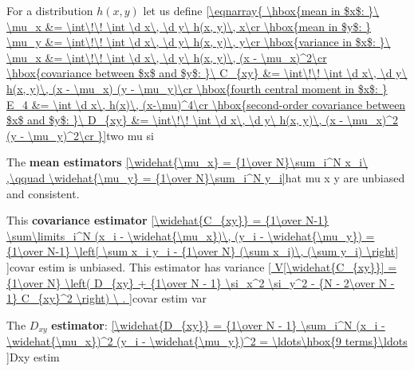 For a distribution $h(x, y)$ let us define
\eqref{\eqnarray{
\hbox{mean in $x$: }\ \mu_x &= \int\!\! \int \d x\, \d y\ h(x, y)\, x\cr
\hbox{mean in $y$: } \mu_y &= \int\!\! \int \d x\, \d y\ h(x, y)\, y\cr
\hbox{variance in $x$: }\ \mu_x &= \int\!\! \int \d x\, \d y\ h(x, y)\, (x - \mu_x)^2\cr
\hbox{covariance between $x$ and $y$: }\ C_{xy} &= \int\!\! \int \d x\, \d y\ h(x, y)\, (x - \mu_x) (y - \mu_y)\cr
\hbox{fourth central moment in $x$: } E_4 &= \int \d x\, h(x)\, (x-\mu)^4\cr
\hbox{second-order covariance between $x$ and $y$: }\ D_{xy} &= \int\!\! \int \d x\, \d y\ h(x, y)\, (x - \mu_x)^2 (y - \mu_y)^2\cr
}}{two mu si}

The {\bf mean estimators}
\eqref{\widehat{\mu_x} = {1\over N}\sum_i^N x_i\ ,\qquad \widehat{\mu_y} = {1\over N}\sum_i^N y_i}{hat mu x y}
are unbiased and consistent.

This {\bf covariance estimator}
\eqref{\widehat{C_{xy}}
	= {1\over N-1} \sum\limits_i^N (x_i - \widehat{\mu_x})\, (y_i - \widehat{\mu_y})
	= {1\over N-1} \left[ \sum x_i y_i - {1\over N} (\sum x_i)\, (\sum y_i) \right]
}{covar estim}
is unbiased. This estimator has variance
\eqref{
V[\widehat{C_{xy}}] = {1\over N} \left(
	D_{xy} + {1\over N - 1} \si_x^2 \si_y^2 - {N - 2\over N - 1} C_{xy}^2
\right) \ .
}{covar estim var}

The $D_{xy}$ {\bf estimator}:
\eqref{\widehat{D_{xy}} = {1\over N - 1} \sum_i^N (x_i - \widehat{\mu_x})^2 (y_i - \widehat{\mu_y})^2 = \ldots\hbox{9 terms}\ldots
}{Dxy estim}

\bye

